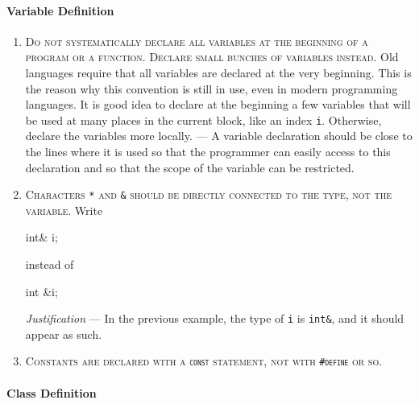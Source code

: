 \documentclass{tufte-book}
\newcounter{points}
\newcommand{\code}[1]{\texttt{#1}}
\renewcommand{\rule}[1]{\textsc{#1}}
\newcommand{\commentcs}[1]{\newline #1}
\newcommand{\commentf}[1]{#1}
\newcommand{\justification}[1]{\newline {\it Justification} --- #1}
\newcommand{\njustification}[1]{{\it Justification} --- #1}
\newenvironment{cenumerate}
{
  \begin{enumerate}\setcounter{enumi}{\value{points}}%
  }
  {
    \setcounter{points}{\value{enumi}}\end{enumerate}
}
\begin{document}
\paragraph{Variable Definition}

\begin{cenumerate}
\item \rule{Do not systematically declare all variables at the beginning of a
    program or a function. Declare small bunches of variables instead.}
  \commentcs{Old languages require that all variables are declared at the very
    beginning. This is the reason why this convention is still in use, even in
    modern programming languages. It is good idea to declare at the beginning
    a few variables that will be used at many places in the current block,
    like an index \code{i}. Otherwise, declare the variables more locally.}
  \justification{A variable declaration should be close to the lines where it
    is used so that the programmer can easily access to this declaration and
    so that the scope of the variable can be restricted.}
\item \rule{Characters \code{*} and \code{\&} should be directly connected to
    the type, not the variable.} \commentcs{Write}
\begin{frame_cpp}
  int& i;
\end{frame_cpp}
\commentf{instead of}
\begin{frame_cpp}
  int &i;
\end{frame_cpp}
\njustification{In the previous example, the type of \code{i} is \code{int\&},
  and it should appear as such.}
\item \rule{Constants are declared with a {\rm \code{const}} statement, not
    with {\rm \code{\#define}} or so.}
\end{cenumerate}

\paragraph{Class Definition}
\end{document}
